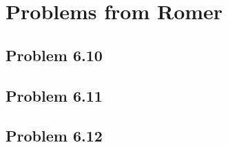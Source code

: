 \documentclass[11pt]{amsart}
\begin{document}
\section{Problems from Romer}
\subsection{Problem 6.10}

\subsection{Problem 6.11}

\subsection{Problem 6.12}
\end{document}
